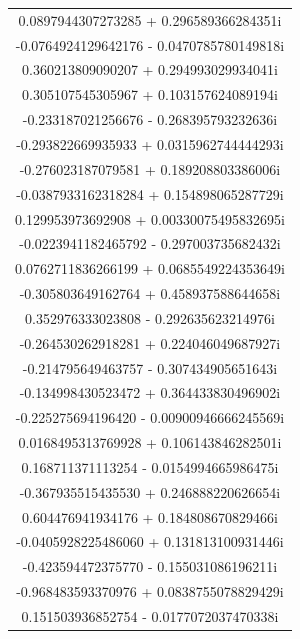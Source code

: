 \documentclass[12pt,a4paper,UTF8]{ctexart}
\begin{document}
\begin{enumerate}
\begin{longtable}{c}
              0.0897944307273285     +   0.296589366284351i   \\
              -0.0764924129642176    -   0.0470785780149818i  \\
              0.360213809090207      +   0.294993029934041i   \\
              0.305107545305967      +   0.103157624089194i   \\
              -0.233187021256676     -   0.268395793232636i   \\
              -0.293822669935933     +   0.0315962744444293i  \\
              -0.276023187079581     +   0.189208803386006i   \\
              -0.0387933162318284    +   0.154898065287729i   \\
              0.129953973692908      +   0.00330075495832695i \\
              -0.0223941182465792    -   0.297003735682432i   \\
              0.0762711836266199     +   0.0685549224353649i  \\
              -0.305803649162764     +   0.458937588644658i   \\
              0.352976333023808      -   0.292635623214976i   \\
              -0.264530262918281     +   0.224046049687927i   \\
              -0.214795649463757     -   0.307434905651643i   \\
              -0.134998430523472     +   0.364433830496902i   \\
              -0.225275694196420     -   0.00900946666245569i \\
              0.0168495313769928     +   0.106143846282501i   \\
              0.168711371113254      -   0.0154994665986475i  \\
              -0.367935515435530     +   0.246888220626654i   \\
              0.604476941934176      +   0.184808670829466i   \\
              -0.0405928225486060    +   0.131813100931446i   \\
              -0.423594472375770     -   0.155031086196211i   \\
              -0.968483593370976     +   0.0838755078829429i  \\
              0.151503936852754      -   0.0177072037470338i
          \end{longtable}


\end{enumerate}
\end{document}
